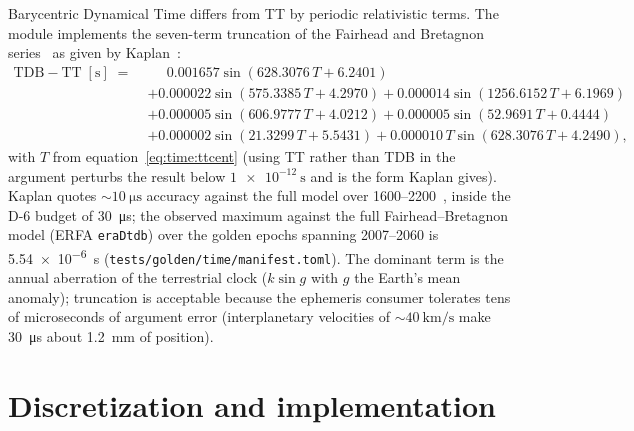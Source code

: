 Barycentric Dynamical Time differs from TT by periodic relativistic terms.
The module implements the seven-term truncation of the Fairhead and
Bretagnon series~\cite{fairhead1990} as given by Kaplan~\cite[eq.~2.6]
{kaplan2005}:
\begin{equation}
  \begin{aligned}
    \mathrm{TDB} - \mathrm{TT} \;[\unit{\second}] \;=\;
      &\phantom{+}\,0.001657 \sin(628.3076\,T + 6.2401)\\
      &+ 0.000022 \sin(575.3385\,T + 4.2970)
       + 0.000014 \sin(1256.6152\,T + 6.1969)\\
      &+ 0.000005 \sin(606.9777\,T + 4.0212)
       + 0.000005 \sin(52.9691\,T + 0.4444)\\
      &+ 0.000002 \sin(21.3299\,T + 5.5431)
       + 0.000010\,T \sin(628.3076\,T + 4.2490),
  \end{aligned}
  \label{eq:time:tdb}
\end{equation}
with $T$ from equation~\eqref{eq:time:ttcent} (using TT rather than TDB in
the argument perturbs the result below $\qty{1e-12}{\second}$ and is the
form Kaplan gives). Kaplan quotes $\sim\!\qty{10}{\micro\second}$ accuracy
against the full model over 1600--2200~\cite{kaplan2005}, inside the D-6
budget of \qty{30}{\micro\second}; the observed maximum against the full
Fairhead--Bretagnon model (ERFA \texttt{eraDtdb}) over the golden epochs
spanning 2007--2060 is \qty{5.54e-6}{\second}
(\texttt{tests/golden/time/manifest.toml}). The dominant term is the annual
aberration of the terrestrial clock ($k \sin g$ with $g$ the Earth's mean
anomaly); truncation is acceptable because the ephemeris consumer tolerates
tens of microseconds of argument error (interplanetary velocities of
$\sim\!\qty{40}{\kilo\metre\per\second}$ make \qty{30}{\micro\second}
about \qty{1.2}{\milli\metre} of position).

\section{Discretization and implementation}
\label{sec:time:implementation}

